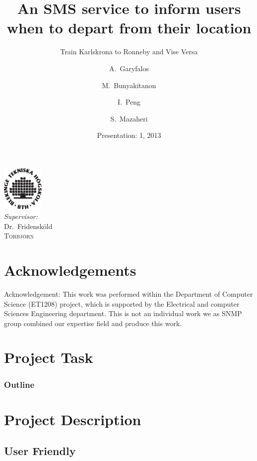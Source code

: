 \documentclass[xcolor=pdftex,dvipsnames,table]{beamer}
\title[SMS Service] %
{An SMS service to inform users when to depart from their location}
\subtitle{Train Karlskrona to Ronneby and Vise Versa}
\author[Garyfalos, Bunyakitanon, Peng, Mazaheri]%
{A.~Garyfalos \and M.~Bunyakitanon \and I.~Peng \and S.~Mazaheri}
\institute[Blekinge Tekniska Högskola, Karlskrona. Sweden] %
{
\\
\medskip
{
\emph{A.atga12@student.bth.se}
\emph{B.ltbu12@student.bth.se}
\emph{C.mepe12@student.bth.se}
\emph{D.shma12@student.bth.se}
}
}
\date[BTH 2013]{Presentation: 1, 2013}
\begin{document}
\begin{frame}[noframenumbering]
  \begin{center}
    \includegraphics[width=0.15\textwidth]{BTH_logo}\\ [0.3cm]    

    \emph{Supervisor:} \\  
    Dr.~Fridensköld\\
    \textsc{Torbjörn} 
  \end{center}
  \titlepage
\end{frame}

\section*{Acknowledgements}
  \begin{frame}
    \begin{center}
{\footnotesize Acknowledgement: This work was performed within the Department of Computer Science (ET1208) project, which is supported by the Electrical and computer Sciences Engineering department. This is not an individual work we as SNMP group combined our expertise field and produce this work.}
    \end{center}
\end{frame}

\section*{Project Task}

\begin{frame}
\frametitle{Outline}
\tableofcontents[pausesections]
\end{frame}

\section{Project Description}
  \subsection{User Friendly}
\end{document}
